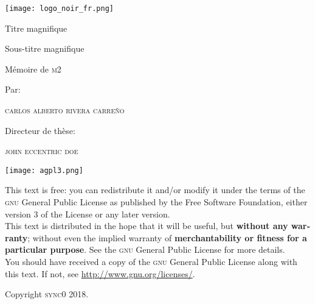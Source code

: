 \documentclass[paper=A4,portrait,twoside=true,twocolumn=false,headinclude=false,footinclude=false,fontsize=11,BCOR=15mm,DIV=calc,pagesize=auto,titlepage=firstiscover,mpinclude=true,headings=normal,headings=twolinechapter,open=right,chapterprefix=false,headsepline=false]{scrbook}
\author{Carlos Alberto Rivera Carreño}
\date{}
\title{}
\begin{document}
\begin{titlepage}
 \centering
 \texttt{[image: logo\_noir\_fr.png]}\par
 \vspace{4\baselineskip}
 {\Huge Titre magnifique \par}
 \vspace{1\baselineskip}
 {\Large Sous-titre magnifique \par}
\vspace*{\fill}
 {\Large Mémoire de \textsc{m2} \par}
 \vspace{2\baselineskip}
 {\large Par: \par}
 {\large \textsc{carlos alberto rivera carreño}\par}
 \vspace{1\baselineskip}
 {\large Directeur de thèse: \par}
 {\large \textsc{john eccentric doe}\par}
\end{titlepage}

\vspace*{\fill}
\noindent
\texttt{[image: agpl3.png]}\par
\vspace{1\baselineskip}
\begin{english}
\noindent
This text is free: you can redistribute it and/or modify it
under the terms of the \textsc{gnu} General Public License as published by
the Free Software Foundation, either version 3 of the License or any later
version. \\

\noindent
This text is distributed in the hope that it will be useful, but \textbf{without
any warranty}; without even the implied warranty of \textbf{merchantability or 
fitness for a particular purpose}. See the \textsc{gnu} General 
Public License for more details. \\

\noindent
You should have received a copy of the \textsc{gnu} General Public License along
with this text. If not, see \url{http://www.gnu.org/licenses/}.

\vspace{1\baselineskip}
\noindent
Copyright \textcopyright \textsc{sync0} 2018. 
\end{english}

\thispagestyle{empty}

\newpage 
\vspace*{\fill}
\end{document}

